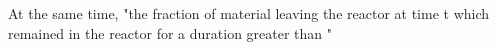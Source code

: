 At the same time, "the fraction of material leaving the reactor at time t which remained in the reactor for a duration greater than "  